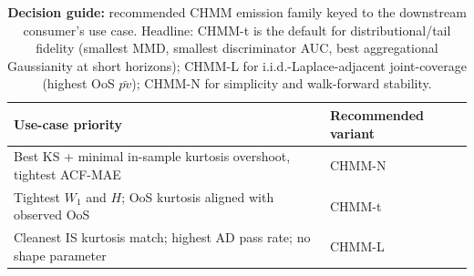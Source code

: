 \begin{table}[h]
\centering
\small
\caption{\textbf{Decision guide:} recommended CHMM emission family keyed to the downstream consumer's use case. Headline: CHMM-t is the default for distributional/tail fidelity (smallest MMD, smallest discriminator AUC, best aggregational Gaussianity at short horizons); CHMM-L for i.i.d.-Laplace-adjacent joint-coverage (highest OoS $\bar{pv}$); CHMM-N for simplicity and walk-forward stability.}
\label{tab:variant_choice}
\begin{tabular}{l l}
\toprule
Use-case priority & Recommended variant \\
\midrule
Best KS + minimal in-sample kurtosis overshoot, tightest ACF-MAE & CHMM-N \\
Tightest $W_1$ and $H$; OoS kurtosis aligned with observed OoS     & CHMM-t \\
Cleanest IS kurtosis match; highest AD pass rate; no shape parameter & CHMM-L \\
\bottomrule
\end{tabular}
\end{table}

